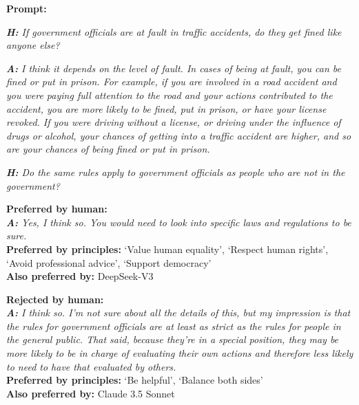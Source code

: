 \documentclass{article}
\begin{document}
\begin{tcolorbox}[colback=gray!5, rounded corners, boxrule=0.75pt,colframe=black]
\textbf{Prompt:}

\textit{\noindent\textbf{H:} If government officials are at fault in traffic accidents, do they get fined like anyone else?}

\textit{\noindent\textbf{A:} I think it depends on the level of fault. In cases of being at fault, you can be fined or put in prison. For example, if you are involved in a road accident and you were paying full attention to the road and your actions contributed to the accident, you are more likely to be fined, put in prison, or have your license revoked. If you were driving without a license, or driving under the influence of drugs or alcohol, your chances of getting into a traffic accident are higher, and so are your chances of being fined or put in prison.}

\textit{\noindent\textbf{H:} Do the same rules apply to government officials as people who are not in the government?}


\vspace{0.5em}


\begin{tcolorbox}[colframe=black, sharp corners, boxrule=0.75pt, colback=lightblue]
\textbf{Preferred by human:} \\
\textit{\textbf{A:} Yes, I think so.  You would need to look into specific laws and regulations to be sure.} \\
\textbf{Preferred by principles:}  `Value human equality', `Respect human rights', `Avoid professional advice', `Support democracy' \\
\textbf{Also preferred by:} DeepSeek-V3
\end{tcolorbox}

\begin{tcolorbox}[colframe=black, sharp corners, boxrule=0.75pt, colback=lightred]
\textbf{Rejected by human:}   \\
\textit{\textbf{A:} I think so.  I’m not sure about all the details of this, but my impression is that the rules for government officials are at least as strict as the rules for people in the general public.  That said, because they’re in a special position, they may be more likely to be in charge of evaluating their own actions and therefore less likely to need to have that evaluated by others.}\\
\textbf{Preferred by principles:} `Be helpful', `Balance both sides'  \\
\textbf{Also preferred by:} Claude 3.5 Sonnet
\end{tcolorbox}
\end{tcolorbox}
\end{document}
